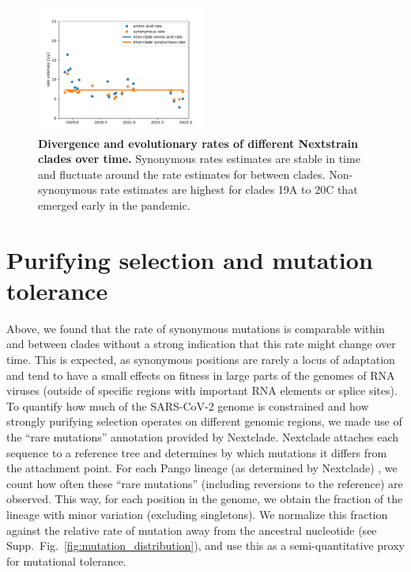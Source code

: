 \documentclass[aps,rmp, twocolumn]{revtex4}
\begin{document}
\begin{figure}
    \includegraphics[width=0.5\textwidth]{figures/rate_progression.pdf}
    \caption{{\bf Divergence and evolutionary rates of different Nextstrain clades over time.} Synonymous rates estimates are stable in time and fluctuate around the rate estimates for between clades. Non-synonymous rate estimates are highest for clades 19A to 20C that emerged early in the pandemic.
    \label{fig:rate_progression} }
\end{figure}




\section*{Purifying selection and mutation tolerance}

Above, we found that the rate of synonymous mutations is comparable within and between clades without a strong indication that this rate might change over time.
This is expected, as synonymous positions are rarely a locus of adaptation and tend to have a small effects on fitness in large parts of the genomes of RNA viruses \citep{zanini_vivo_2017} (outside of specific regions with important RNA elements or splice sites).
To quantify how much of the SARS-CoV-2 genome is constrained and how strongly purifying selection operates on different genomic regions, we made use of the ``rare mutations'' annotation provided by Nextclade.
Nextclade attaches each sequence to a reference tree and determines by which mutations it differs from the attachment point.
For each Pango lineage (as determined by Nextclade) \citep{rambaut_dynamic_2020,aksamentov_nextclade_2021}, we count how often these ``rare mutations'' (including reversions to the reference) are observed.
This way, for each position in the genome, we obtain the fraction of the lineage with minor variation (excluding singletons).
We normalize this fraction against the relative rate of mutation away from the ancestral nucleotide (see Supp.~Fig.~\ref{fig:mutation_distribution}), and use this as a semi-quantitative proxy for mutational tolerance.
\end{document}
